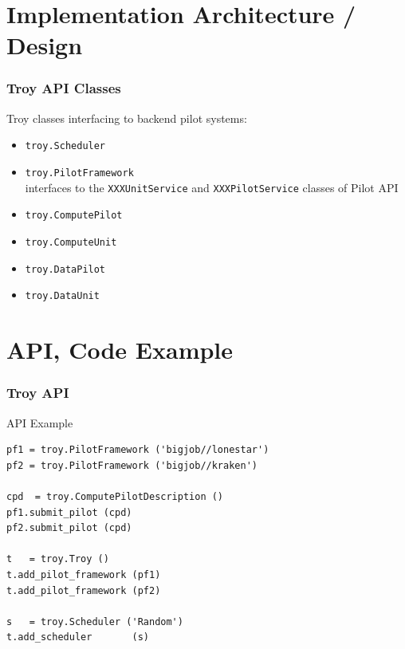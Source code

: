 \documentclass{beamer}
\begin{document}
\section{Implementation Architecture / Design}

\begin{frame}[fragile]
	\frametitle{Troy API Classes}
   Troy classes interfacing to backend pilot systems:

  \begin{itemize}
    \item \verb|troy.Scheduler|\\
    \item \verb|troy.PilotFramework|\\
     interfaces to the \verb|XXXUnitService| and \verb|XXXPilotService|
     classes of Pilot API

    \item \verb|troy.ComputePilot|
    \item \verb|troy.ComputeUnit|

    \item \verb|troy.DataPilot|
    \item \verb|troy.DataUnit|
  \end{itemize}
\end{frame}

% 
% 

\section{API, Code Example}

\begin{frame}[fragile] 
 \frametitle{Troy API}
 {\footnotesize
 \begin{block}{API Example}

\begin{verbatim}
pf1 = troy.PilotFramework ('bigjob//lonestar')
pf2 = troy.PilotFramework ('bigjob//kraken')

cpd  = troy.ComputePilotDescription ()
pf1.submit_pilot (cpd)
pf2.submit_pilot (cpd)

t   = troy.Troy ()
t.add_pilot_framework (pf1)
t.add_pilot_framework (pf2)

s   = troy.Scheduler ('Random')
t.add_scheduler       (s)
\end{verbatim}

 \end{block}
 }
\end{frame}
\end{document}

